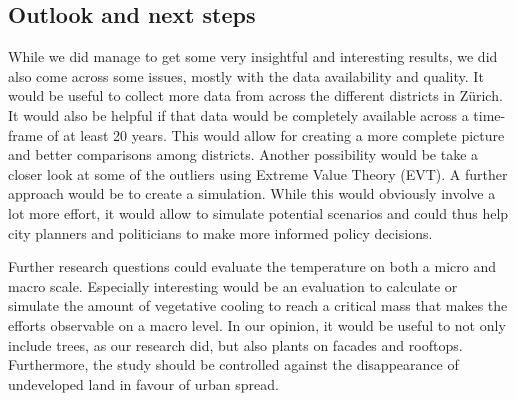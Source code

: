 \documentclass[
]{article}
\begin{document}
\hypertarget{outlook-and-next-steps}{%
\subsection{Outlook and next steps}\label{outlook-and-next-steps}}

While we did manage to get some very insightful and interesting results,
we did also come across some issues, mostly with the data availability
and quality. It would be useful to collect more data from across the
different districts in Zürich. It would also be helpful if that data
would be completely available across a time-frame of at least 20 years.
This would allow for creating a more complete picture and better
comparisons among districts. Another possibility would be take a closer
look at some of the outliers using Extreme Value Theory (EVT). A further
approach would be to create a simulation. While this would obviously
involve a lot more effort, it would allow to simulate potential
scenarios and could thus help city planners and politicians to make more
informed policy decisions.

Further research questions could evaluate the temperature on both a
micro and macro scale. Especially interesting would be an evaluation to
calculate or simulate the amount of vegetative cooling to reach a
critical mass that makes the efforts observable on a macro level. In our
opinion, it would be useful to not only include trees, as our research
did, but also plants on facades and rooftops. Furthermore, the study
should be controlled against the disappearance of undeveloped land in
favour of urban spread.
\end{document}
